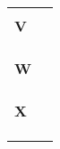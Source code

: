 \begin{longtable}{p{2.5cm}p{9.5cm}}
\\
\\
\huge{\textbf{V}}& \\
\hline
\\

\\
\\
\huge{\textbf{W}}& \\
\hline
\\

\\
\\
\huge{\textbf{X}}& \\
\hline
\\

\\
\\
\end{longtable}



